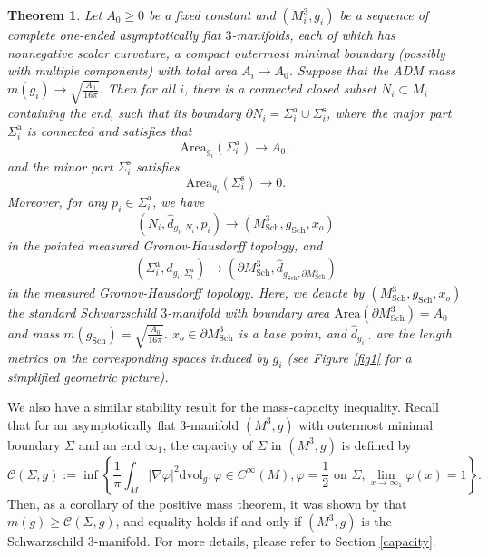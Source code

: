 \documentclass[letter]{amsart}
\newtheorem{thm}{Theorem}[section]
\theoremstyle{definition}
\theoremstyle{remark}
\def\Area{\mathrm{Area}}
\begin{document}
\begin{thm}\label{Penrose-stability}
	Let $A_0 \geq 0$ be a fixed constant and $(M_i^{3}, g_i)$ be a sequence of complete one-ended asymptotically flat $3$-manifolds, each of which has nonnegative scalar curvature, a compact outermost minimal boundary (possibly with multiple components) with total area $A_i \to A_0$. Suppose that the ADM mass $m(g_i)\to \sqrt{\frac{A_0}{16 \pi }} $. Then for all $i$, there is a connected closed subset $N_i \subset M_i$ containing the end, such that its boundary $\partial N_i = \Sigma _i^{\mathrm{a}} \cup \Sigma _i^{\mathrm{s}}$, where the major part $\Sigma _i^{\mathrm{a}}$ is connected and satisfies that 
	$$\Area_{g_i}(\Sigma _i^{\mathrm{a}}) \to A_0,$$
	and the minor part $\Sigma _i^{\mathrm{s}}$ satisfies
	$$\mathrm{Area}_{g_i}(\Sigma _i^{\mathrm{s}}) \to 0.$$
	Moreover, for any $p_i \in \Sigma _i^{\mathrm{a}}$, we have
	$$
	(N _i , \hat{d}_{g_i, N_i}, p_i ) \to (M_{\mathrm{Sch}}^{3}, g_{\mathrm{Sch}}, x_o)
	$$ 
	in the pointed measured Gromov-Hausdorff topology, and
	\begin{align*}
	(\Sigma _i^{\mathrm{a}}, \hat{d}_{g_i, \Sigma _i^{\mathrm{a}}} ) \to (\partial M_{\mathrm{Sch}}^3, \hat{d}_{g_{\mathrm{Sch}}, \partial M^3_{\mathrm{Sch}}})	
	\end{align*}
	in the measured Gromov-Hausdorff topology. Here, we denote by $(M_{\mathrm{Sch}}^{3}, g_{\mathrm{Sch}}, x_o)$ the standard Schwarzschild $3$-manifold with boundary area $\mathrm{Area}(\partial M^{3}_{\mathrm{Sch}}) = A_0$ and mass $m(g_{\mathrm{Sch}}) = \sqrt{ \frac{A_0}{16 \pi }} $. $x_o \in \partial M_{\mathrm{Sch}}^3$ is a base point, and $\hat{d}_{g_i, \cdot }$ are the length metrics on the corresponding spaces induced by $g_i$ (see Figure \ref{fig1} for a simplified geometric picture).
\end{thm}

We also have a similar stability result for the mass-capacity inequality. Recall that for an asymptotically flat $3$-manifold $(M^3,g)$ with outermost minimal boundary $\Sigma$ and an end $\infty_1$, the capacity of $\Sigma$ in $(M^3, g)$ is defined by $$
\mathcal{C}(\Sigma, g) := \inf \left\{ \frac{1}{\pi } \int_{M}|\nabla \varphi |^2 \mathrm{dvol}_g: \varphi \in C^{\infty}(M), \varphi =\frac{1}{2} \text{ on } \Sigma, \lim_{x\to \infty_1} \varphi (x) =1	\right\}. 
$$ 
Then, as a corollary of the positive mass theorem, it was shown by \cite[Theorem 9]{Bray'01} that $m(g)\geq  \mathcal{C}(\Sigma, g)$, and equality holds if and only if $(M^3, g)$ is the Schwarzschild $3$-manifold. For more details, please refer to Section \ref{capacity}. 
\end{document}
